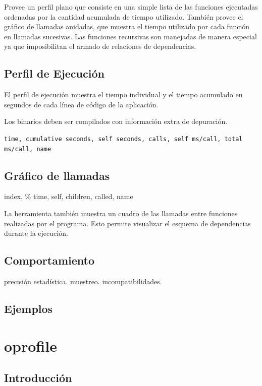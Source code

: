 \documentclass[a4paper]{report}
\begin{document}
\bigskip

Provee un perfil plano que consiste en una simple lista de las funciones
ejecutadas ordenadas por la cantidad acumulada de tiempo utilizado.
Tambi\'en provee el gr\'afico de llamadas anidadas, que muestra el tiempo
utilizado por cada funci\'on en llamadas sucesivas. Las funciones recursivas
son manejadas de manera especial ya que imposibilitan el armado de relaciones
de dependencias.

\subsection{Perfil de Ejecuci\'on}

El perfil de ejecuci\'on muestra el tiempo individual y el tiempo acumulado en segundos
de cada l\'inea de c\'odigo de la aplicaci\'on.

Los binarios deben ser compilados con informaci\'on extra de depuraci\'on.

{\tt time, cumulative seconds, self seconds, calls, self ms/call,
  total ms/call, name}

\subsection{Gr\'afico de llamadas}

index, \% time, self, children, called, name

La herramienta tambi\'en muestra un cuadro de las llamadas entre funciones realizadas por el programa.
Esto permite visualizar el esquema de dependencias durante la ejecuci\'on.

\subsection{Comportamiento}

precisi\'on estad\'istica. muestreo. incompatibilidades.

\subsection{Ejemplos}

\section{oprofile}

\subsection{Introducci\'on}
\end{document}
